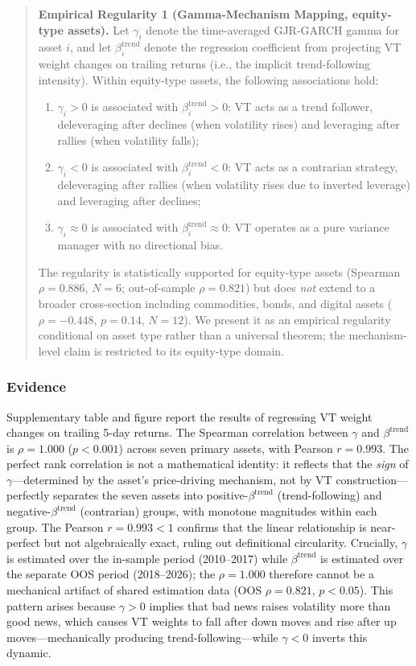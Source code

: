 \begin{quote}
\textbf{Empirical Regularity 1 (Gamma-Mechanism Mapping, equity-type assets).}
Let $\gamma_i$ denote the time-averaged GJR-GARCH gamma for asset $i$, and let $\beta^{\text{trend}}_i$ denote the regression coefficient from projecting VT weight changes on trailing returns (i.e., the implicit trend-following intensity). Within equity-type assets, the following associations hold:
\begin{enumerate}
\item[(i)] $\gamma_i > 0$ is associated with $\beta^{\text{trend}}_i > 0$: VT acts as a trend follower, deleveraging after declines (when volatility rises) and leveraging after rallies (when volatility falls);
\item[(ii)] $\gamma_i < 0$ is associated with $\beta^{\text{trend}}_i < 0$: VT acts as a contrarian strategy, deleveraging after rallies (when volatility rises due to inverted leverage) and leveraging after declines;
\item[(iii)] $\gamma_i \approx 0$ is associated with $\beta^{\text{trend}}_i \approx 0$: VT operates as a pure variance manager with no directional bias.
\end{enumerate}
The regularity is statistically supported for equity-type assets (Spearman $\rho = 0.886$, $N = 6$; out-of-sample $\rho = 0.821$) but does \emph{not} extend to a broader cross-section including commodities, bonds, and digital assets ($\rho = -0.448$, $p = 0.14$, $N = 12$). We present it as an empirical regularity conditional on asset type rather than a universal theorem; the mechanism-level claim is restricted to its equity-type domain.\end{quote}

\subsubsection{Evidence}

Supplementary table and figure report the results of regressing VT weight changes on trailing 5-day returns. The Spearman correlation between $\gamma$ and $\beta^{\text{trend}}$ is $\rho = 1.000$ ($p < 0.001$) across seven primary assets, with Pearson $r = 0.993$. The perfect rank correlation is not a mathematical identity: it reflects that the \emph{sign} of $\gamma$---determined by the asset's price-driving mechanism, not by VT construction---perfectly separates the seven assets into positive-$\beta^{\text{trend}}$ (trend-following) and negative-$\beta^{\text{trend}}$ (contrarian) groups, with monotone magnitudes within each group. The Pearson $r = 0.993 < 1$ confirms that the linear relationship is near-perfect but not algebraically exact, ruling out definitional circularity. Crucially, $\gamma$ is estimated over the in-sample period (2010--2017) while $\beta^{\text{trend}}$ is estimated over the separate OOS period (2018--2026); the $\rho = 1.000$ therefore cannot be a mechanical artifact of shared estimation data (OOS $\rho = 0.821$, $p < 0.05$). This pattern arises because $\gamma > 0$ implies that bad news raises volatility more than good news, which causes VT weights to fall after down moves and rise after up moves---mechanically producing trend-following---while $\gamma < 0$ inverts this dynamic.

